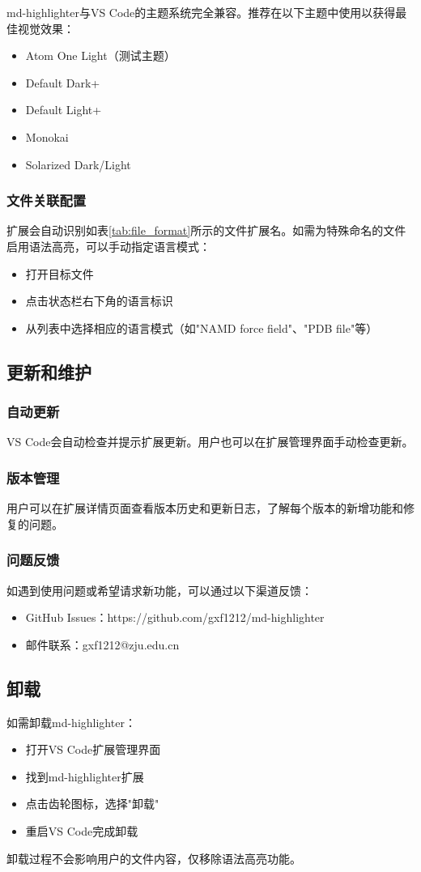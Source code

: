 md-highlighter与VS Code的主题系统完全兼容。推荐在以下主题中使用以获得最佳视觉效果：
\begin{itemize}
    \item Atom One Light（测试主题）
    \item Default Dark+
    \item Default Light+
    \item Monokai
    \item Solarized Dark/Light
\end{itemize}

\subsubsection{文件关联配置}

扩展会自动识别如表\ref{tab:file_format}所示的文件扩展名。如需为特殊命名的文件启用语法高亮，可以手动指定语言模式：
\begin{itemize}
    \item 打开目标文件
    \item 点击状态栏右下角的语言标识
    \item 从列表中选择相应的语言模式（如"NAMD force field"、"PDB file"等）
\end{itemize}

\subsection{更新和维护}

\subsubsection{自动更新}

VS Code会自动检查并提示扩展更新。用户也可以在扩展管理界面手动检查更新。

\subsubsection{版本管理}

用户可以在扩展详情页面查看版本历史和更新日志，了解每个版本的新增功能和修复的问题。

\subsubsection{问题反馈}

如遇到使用问题或希望请求新功能，可以通过以下渠道反馈：
\begin{itemize}
    \item GitHub Issues：https://github.com/gxf1212/md-highlighter
    \item 邮件联系：gxf1212@zju.edu.cn
\end{itemize}

\subsection{卸载}

如需卸载md-highlighter：
\begin{itemize}
    \item 打开VS Code扩展管理界面
    \item 找到md-highlighter扩展
    \item 点击齿轮图标，选择"卸载"
    \item 重启VS Code完成卸载
\end{itemize}

卸载过程不会影响用户的文件内容，仅移除语法高亮功能。